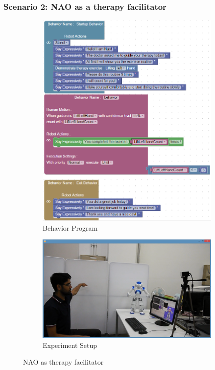 \documentclass{llncs}
\begin{document}
\subsubsection{Scenario 2: NAO as a therapy facilitator}%
\begin{figure}
\centering
\begin{subfigure}[t]{0.48\textwidth}
\includegraphics[width=\textwidth]{../thesis/assets/scenario2.png}
\caption[Behavior Program]{Behavior Program}
\label{fig:scenario2_program}
\end{subfigure}
\begin{subfigure}[t]{0.48\textwidth}
\includegraphics[width=\textwidth]{../thesis/assets/scenario_therapy.png}
\caption[Experiment Setup]{Experiment Setup}
\label{fig:scenario2_setup}
\end{subfigure}
\caption[NAO as therapy facilitator]{NAO as therapy facilitator}
\label{fig:scenarios}
\end{figure}
\end{document}
